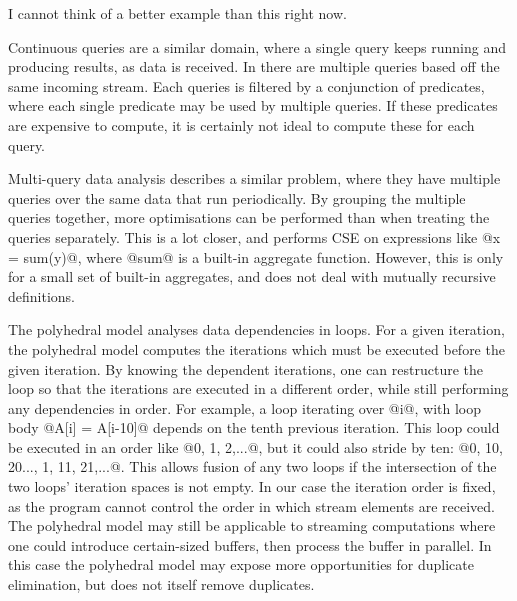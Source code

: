 I cannot think of a better example than this right now.

Continuous queries are a similar domain, where a single query keeps running and producing results, as data is received.
In \cite{munagala2007optimization} there are multiple queries based off the same incoming stream.
Each queries is filtered by a conjunction of predicates, where each single predicate may be used by multiple queries.
If these predicates are expensive to compute, it is certainly not ideal to compute these for each query.

Multi-query data analysis\cite{andrade2003efficient} describes a similar problem, where they have multiple queries over the same data that run periodically.
By grouping the multiple queries together, more optimisations can be performed than when treating the queries separately.
This is a lot closer, and performs CSE on expressions like @x = sum(y)@, where @sum@ is a built-in aggregate function.
However, this is only for a small set of built-in aggregates, and does not deal with mutually recursive definitions.


The polyhedral model\cite{benabderrahmane2010polyhedral} analyses data dependencies in loops.
For a given iteration, the polyhedral model computes the iterations which must be executed before the given iteration.
By knowing the dependent iterations, one can restructure the loop so that the iterations are executed in a different order, while still performing any dependencies in order.
For example, a loop iterating over @i@, with loop body @A[i] = A[i-10]@ depends on the tenth previous iteration.
This loop could be executed in an order like @0, 1, 2,...@, but it could also stride by ten: @0, 10, 20..., 1, 11, 21,...@.
This allows fusion of any two loops if the intersection of the two loops' iteration spaces is not empty.
In our case the iteration order is fixed, as the program cannot control the order in which stream elements are received.
The polyhedral model may still be applicable to streaming computations where one could introduce certain-sized buffers, then process the buffer in parallel.
In this case the polyhedral model may expose more opportunities for duplicate elimination, but does not itself remove duplicates.


